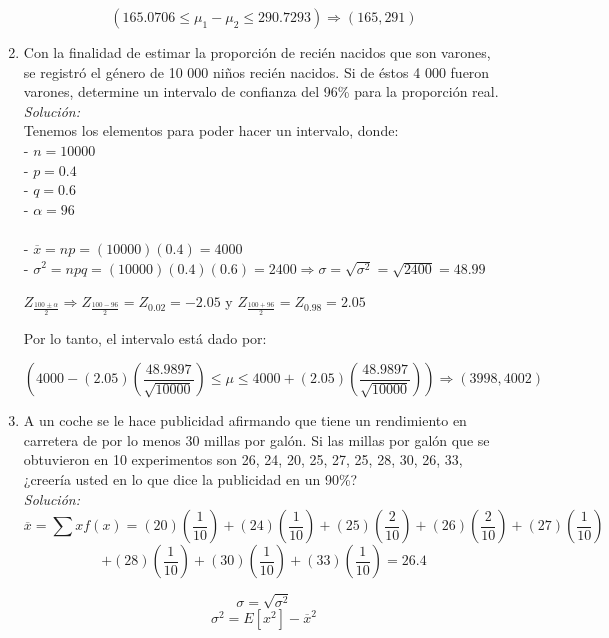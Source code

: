 \begin{enumerate}
    $$(165.0706 \leq \mu_{1} - \mu_{2} \leq 290.7293) \Rightarrow (165,291)  $$ 
    \item Con la finalidad de estimar la proporción de recién nacidos que son varones, se registró el género de 10 000 niños recién nacidos. Si de éstos 4 000 fueron varones, determine un intervalo de confianza del 96\% para la proporción real. \\
    
    \textit{Solución: } \\
    Tenemos los elementos para poder hacer un intervalo, donde: \\
    - $ n = 10000 $ \\
    - $ p = 0.4 $ \\ 
    - $ q = 0.6 $ \\ 
    - $ \alpha = 96 $ \\ \\
    - $ \overline{x} = np = (10000)(0.4) = 4000 $ \\
    - $ \sigma^2 = npq = (10000)(0.4)(0.6) = 2400  \Rightarrow \sigma = \sqrt{\sigma^2} = \sqrt{2400} = 48.99 $ \\
    
    \begin{center}
        $ Z_{\frac{100 \pm \alpha}{2}} \Rightarrow  Z_{\frac{100-96}{2}} = Z_{0.02} = -2.05 $ y $ Z_{\frac{100+96}{2}} = Z_{0.98} = 2.05  $ 
    \end{center}
    Por lo tanto, el intervalo está dado por: 
    
    $$  \left(   4000 - (2.05)\left( \frac{48.9897}{\sqrt{10000}} \right)   \leq \mu \leq 4000 + (2.05)\left( \frac{48.9897}{\sqrt{10000}} \right)      \right)   \Rightarrow (3998,4002) $$
    \item A un coche se le hace publicidad afirmando que tiene un rendimiento en carretera de por lo menos 30 millas por galón. Si las millas por galón que se obtuvieron en 10 experimentos son 26, 24, 20, 25, 27, 25, 28, 30, 26, 33, ¿creería usted en lo que dice la publicidad en un 90\%? \\
    
    \textit{Solución: } 
    $$ \overline{x} = \sum xf(x)= (20)\left( \frac{1}{10} \right) + (24)\left( \frac{1}{10} \right) + (25)\left( \frac{2}{10} \right) + (26)\left( \frac{2}{10} \right) + (27)\left( \frac{1}{10} \right) $$ $$ +  (28)\left( \frac{1}{10} \right) + (30)\left( \frac{1}{10} \right)+ (33)\left( \frac{1}{10} \right) = 26.4 $$
    
    
    $$ \sigma = \sqrt{\sigma^2} $$
    $$ \sigma^2 = E[x^2] - \overline{x}^2 $$
    

\end{enumerate}
